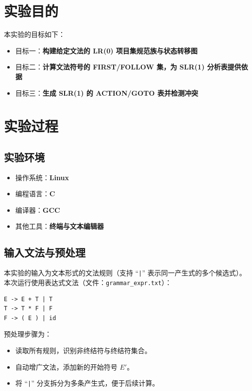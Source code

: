 \documentclass[12pt,a4paper]{ctexart}
\title{\reporttitle}
\author{\authname：\underline{李祥熙} \quad \authid：\underline{2234412799}}
\date{\today}
\begin{document}
\maketitle
\tableofcontents
\newpage

\section{实验目的}
本实验的目标如下：
\begin{itemize}
	\item 目标一：\textbf{构建给定文法的 LR(0) 项目集规范族与状态转移图}
	\item 目标二：\textbf{计算文法符号的 FIRST/FOLLOW 集，为 SLR(1) 分析表提供依据}
	\item 目标三：\textbf{生成 SLR(1) 的 ACTION/GOTO 表并检测冲突}
\end{itemize}

\section{实验过程}
\subsection{实验环境}
\begin{itemize}
	\item 操作系统：\textbf{Linux}
	\item 编程语言：\textbf{C}
	\item 编译器：\textbf{GCC}
	\item 其他工具：\textbf{终端与文本编辑器}
\end{itemize}

\subsection{输入文法与预处理}
本实验的输入为文本形式的文法规则（支持 ``\texttt{|}'' 表示同一产生式的多个候选式）。
本次运行使用表达式文法（文件：\texttt{grammar\_expr.txt}）：
\begin{verbatim}
E -> E + T | T
T -> T * F | F
F -> ( E ) | id
\end{verbatim}
预处理步骤为：
\begin{itemize}
	\item 读取所有规则，识别非终结符与终结符集合。
	\item 自动增广文法，添加新的开始符号 $E'$。
	\item 将 ``\texttt{|}'' 分支拆分为多条产生式，便于后续计算。
\end{itemize}
\end{document}
